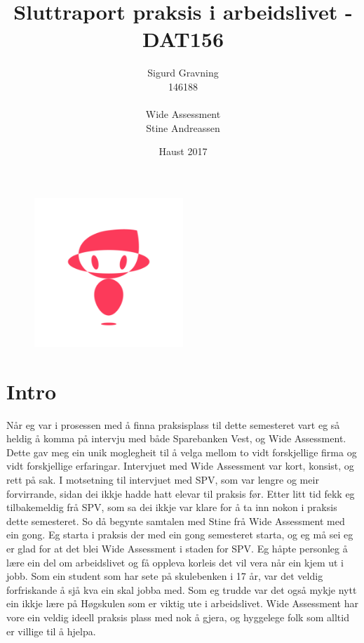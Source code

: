 \documentclass[12pt]{article}
\title{Sluttraport praksis i arbeidslivet - DAT156}
\date{Haust 2017}
\author{Sigurd Gravning \\146188 \\ \\Wide Assessment \\Stine Andreassen}
\begin{document}
\maketitle

\begin{figure}[!h]
  \includegraphics[width=0.5\textwidth]{WA}
  \centering
\end{figure}

\newpage
{}
\tableofcontents
\newpage

\section{Intro}

Når eg var i prosessen med å finna praksisplass til dette semesteret vart eg så
heldig å komma på intervju med både Sparebanken Vest, og Wide Assessment.
Dette gav meg ein unik moglegheit til å velga mellom to vidt forskjellige firma
og vidt forskjellige erfaringar. Intervjuet med Wide Assessment var kort, konsist,
og rett på sak. I motsetning til intervjuet med SPV, som var lengre og meir forvirrande,
sidan dei ikkje hadde hatt elevar til praksis før. Etter litt tid fekk eg
tilbakemeldig frå SPV, som sa dei ikkje var klare for å ta inn nokon i praksis
dette semesteret. So då begynte samtalen med Stine frå Wide Assessment med ein gong.
Eg starta  i praksis der med ein gong semesteret starta, og eg må sei eg er glad
for at det blei Wide Assessment i staden for SPV. Eg håpte personleg å lære ein
del om arbeidslivet og få oppleva korleis det vil vera når ein kjem ut i jobb.
Som ein student som har sete på skulebenken i 17 år, var det veldig forfriskande
å sjå kva ein skal jobba med. Som eg trudde var det også mykje nytt ein ikkje
lære på Høgskulen som er viktig ute i arbeidslivet. Wide Assessment har vore
ein veldig ideell praksis plass med nok å gjera, og hyggelege folk som alltid
er villige til å hjelpa.
\end{document}
